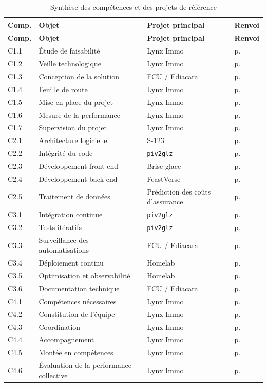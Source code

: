 \begin{longtable}{p{1.4cm} p{5.6cm} p{4.0cm} p{3.4cm}}
\caption{Synthèse des compétences et des projets de référence}\label{tab:synthese-competences}\\
\toprule
\textbf{Comp.} & \textbf{Objet} & \textbf{Projet principal} & \textbf{Renvoi} \\
\midrule
\endfirsthead
\toprule
\textbf{Comp.} & \textbf{Objet} & \textbf{Projet principal} & \textbf{Renvoi} \\
\midrule
\endhead
C1.1 & Étude de faisabilité & Lynx Immo & p.~\pageref{chap:lynx} \\
C1.2 & Veille technologique & Lynx Immo & p.~\pageref{sec:lynx-veille} \\
C1.3 & Conception de la solution & FCU / Ediacara & p.~\pageref{chap:fcu} \\
C1.4 & Feuille de route & Lynx Immo & p.~\pageref{chap:lynx} \\
C1.5 & Mise en place du projet & Lynx Immo & p.~\pageref{chap:lynx} \\
C1.6 & Mesure de la performance & Lynx Immo & p.~\pageref{chap:lynx} \\
C1.7 & Supervision du projet & Lynx Immo & p.~\pageref{chap:lynx} \\
\midrule
C2.1 & Architecture logicielle & S-123 & p.~\pageref{chap:s123} \\
C2.2 & Intégrité du code & \texttt{piv2glz} & p.~\pageref{chap:piv2glz} \\
C2.3 & Développement front-end & Brise-glace & p.~\pageref{chap:brise-glace} \\
C2.4 & Développement back-end & FeastVerse & p.~\pageref{chap:feastverse} \\
C2.5 & Traitement de données & Prédiction des coûts d'assurance & p.~\pageref{chap:data-ia} \\
\midrule
C3.1 & Intégration continue & \texttt{piv2glz} & p.~\pageref{chap:piv2glz} \\
C3.2 & Tests itératifs & \texttt{piv2glz} & p.~\pageref{chap:piv2glz} \\
C3.3 & Surveillance des automatisations & FCU / Ediacara & p.~\pageref{chap:fcu} \\
C3.4 & Déploiement continu & Homelab & p.~\pageref{chap:homelab} \\
C3.5 & Optimisation et observabilité & Homelab & p.~\pageref{chap:homelab} \\
C3.6 & Documentation technique & FCU / Ediacara & p.~\pageref{chap:fcu} \\
\midrule
C4.1 & Compétences nécessaires & Lynx Immo & p.~\pageref{chap:lynx} \\
C4.2 & Constitution de l'équipe & Lynx Immo & p.~\pageref{chap:lynx} \\
C4.3 & Coordination & Lynx Immo & p.~\pageref{chap:lynx} \\
C4.4 & Accompagnement & Lynx Immo & p.~\pageref{chap:lynx} \\
C4.5 & Montée en compétences & Lynx Immo & p.~\pageref{chap:lynx} \\
C4.6 & Évaluation de la performance collective & Lynx Immo & p.~\pageref{chap:lynx} \\
\bottomrule
\end{longtable}

